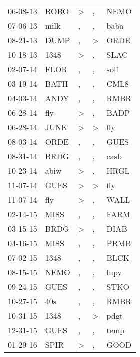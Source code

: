 \begin{supertabular}{lllll}
 06-08-13 &   ROBO &     \textgreater &                , &   NEMO \\
 07-06-13 &   milk &                , &                , &   baba \\
 08-21-13 &   DUMP &                , &     \textgreater &   ORDE \\
 10-18-13 &   1348 &     \textgreater &                , &   SLAC \\
 02-07-14 &   FLOR &                , &                , &   sol1 \\
 03-19-14 &   BATH &                , &                , &   CML8 \\
 04-03-14 &   ANDY &                , &                , &   RMBR \\
 06-28-14 &    fly &     \textgreater &                , &   BADP \\
 06-28-14 &   JUNK &     \textgreater &     \textgreater &    fly \\
 08-03-14 &   ORDE &                , &                , &   GUES \\
 08-31-14 &   BRDG &                , &                , &   casb \\
 10-23-14 &   abiw &     \textgreater &                , &   HRGL \\
 11-07-14 &   GUES &     \textgreater &     \textgreater &    fly \\
 11-07-14 &    fly &     \textgreater &                , &   WALL \\
 02-14-15 &   MISS &                , &                , &   FARM \\
 03-15-15 &   BRDG &     \textgreater &                , &   DIAB \\
 04-16-15 &   MISS &                , &                , &   PRMB \\
 07-02-15 &   1348 &                , &                , &   BLCK \\
 08-15-15 &   NEMO &                , &                , &   lupy \\
 09-24-15 &   GUES &                , &                , &   STKO \\
 10-27-15 &    40s &                , &                , &   RMBR \\
 10-31-15 &   1348 &                , &     \textgreater &   pdgt \\
 12-31-15 &   GUES &                , &                , &   temp \\
 01-29-16 &   SPIR &     \textgreater &                , &   GOOD \\

\end{supertabular}

